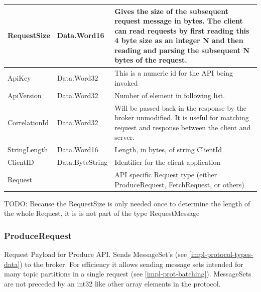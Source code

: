 \begin{table}[H]
\centering
\begin{tabular}{ l  l  p{10cm} }
\hline
RequestSize   & Data.Word16     & Gives the size of the subsequent request message in bytes. The client can read requests by first reading this 4 byte size as an integer N and then reading and parsing the subsequent N bytes of the request. \\ \hline
ApiKey        & Data.Word32     & This is a numeric id for the API being invoked                                                                                                                                                              \\ \hline
ApiVersion    & Data.Word32     & Number of element in following list.                                                                                                                                                                          \\ \hline
CorrelationId & Data.Word32     & Will be passed back in the response by the broker unmodified. It is useful for matching request and response between the client and server.                                                                   \\ \hline
StringLength  & Data.Word16     & Length, in bytes, of string ClientId                                                                                                                                                                          \\ \hline
ClientID      & Data.ByteString & Identifier for the client application                                                                                                                                                                         \\ \hline
Request       &                 & API specific Request type (either ProduceRequest, FetchRequest, or others)                                                                                                                                    \\ \hline
\end{tabular}
\end{table}

TODO: Because the RequestSize is only needed once to determine the length of the whole Request, it is is not part of the type RequestMessage

\subsubsection{ProduceRequest}
Request Payload for Produce API. Sends MessageSet's (see 
\ref{impl-protocol-types-data}) to the broker. For efficiency it allows sending
message sets intended for many topic partitions in a single request (see
\ref{impl-prot-batching}). MessageSets are not preceded by an int32 like other
array elements in the protocol.

